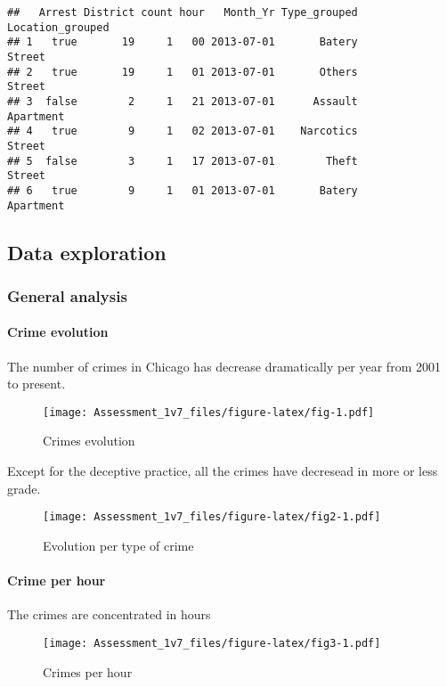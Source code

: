 \documentclass[]{article}
\let\oldparagraph\paragraph
\renewcommand{\paragraph}[1]{\oldparagraph{#1}\mbox{}}
\begin{document}
\begin{verbatim}
##   Arrest District count hour   Month_Yr Type_grouped Location_grouped
## 1   true       19     1   00 2013-07-01       Batery           Street
## 2   true       19     1   01 2013-07-01       Others           Street
## 3  false        2     1   21 2013-07-01      Assault        Apartment
## 4   true        9     1   02 2013-07-01    Narcotics           Street
## 5  false        3     1   17 2013-07-01        Theft           Street
## 6   true        9     1   01 2013-07-01       Batery        Apartment
\end{verbatim}

\subsection{Data exploration}\label{data-exploration}

\subsubsection{General analysis}\label{general-analysis}

\paragraph{Crime evolution}\label{crime-evolution}

The number of crimes in Chicago has decrease dramatically per year from
2001 to present.

\begin{figure}[htbp]
\centering
\texttt{[image: Assessment\_1v7\_files/figure-latex/fig-1.pdf]}
\caption{Crimes evolution}
\end{figure}

Except for the deceptive practice, all the crimes have decresead in more
or less grade.

\begin{figure}[htbp]
\centering
\texttt{[image: Assessment\_1v7\_files/figure-latex/fig2-1.pdf]}
\caption{Evolution per type of crime}
\end{figure}

\paragraph{Crime per hour}\label{crime-per-hour}

The crimes are concentrated in hours

\begin{figure}[htbp]
\centering
\texttt{[image: Assessment\_1v7\_files/figure-latex/fig3-1.pdf]}
\caption{Crimes per hour}
\end{figure}
\end{document}
